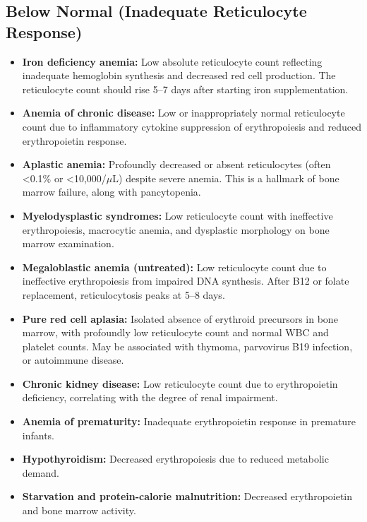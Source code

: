 \subsection*{Below Normal (Inadequate Reticulocyte Response)}
\begin{itemize}
  \item \textbf{Iron deficiency anemia:} Low absolute reticulocyte count reflecting inadequate hemoglobin synthesis and decreased red cell production. The reticulocyte count should rise 5--7 days after starting iron supplementation.
  \item \textbf{Anemia of chronic disease:} Low or inappropriately normal reticulocyte count due to inflammatory cytokine suppression of erythropoiesis and reduced erythropoietin response.
  \item \textbf{Aplastic anemia:} Profoundly decreased or absent reticulocytes (often <0.1\% or <10,000/$\mu$L) despite severe anemia. This is a hallmark of bone marrow failure, along with pancytopenia.
  \item \textbf{Myelodysplastic syndromes:} Low reticulocyte count with ineffective erythropoiesis, macrocytic anemia, and dysplastic morphology on bone marrow examination.
  \item \textbf{Megaloblastic anemia (untreated):} Low reticulocyte count due to ineffective erythropoiesis from impaired DNA synthesis. After B12 or folate replacement, reticulocytosis peaks at 5--8 days.
  \item \textbf{Pure red cell aplasia:} Isolated absence of erythroid precursors in bone marrow, with profoundly low reticulocyte count and normal WBC and platelet counts. May be associated with thymoma, parvovirus B19 infection, or autoimmune disease.
  \item \textbf{Chronic kidney disease:} Low reticulocyte count due to erythropoietin deficiency, correlating with the degree of renal impairment.
  \item \textbf{Anemia of prematurity:} Inadequate erythropoietin response in premature infants.
  \item \textbf{Hypothyroidism:} Decreased erythropoiesis due to reduced metabolic demand.
  \item \textbf{Starvation and protein-calorie malnutrition:} Decreased erythropoietin and bone marrow activity.
\end{itemize}

